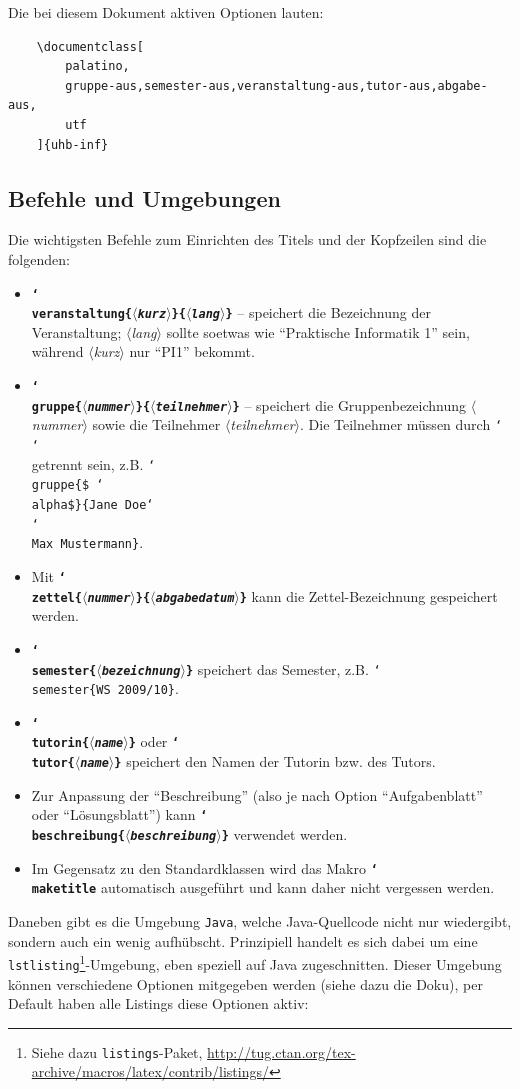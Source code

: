 \documentclass[palatino,gruppe-aus,semester-aus,veranstaltung-aus,abgabe-aus,tutor-aus,utf]{../cls/uhb-inf}
\def\option#1{\texttt{\bfseries #1}}
\def\cs#1{\char`\\#1}
\def\p#1{$\langle$\textit{#1}$\rangle$}
\def\pb#1{\{\p{#1}\}}
\begin{document}
\newpage

Die bei diesem Dokument aktiven Optionen lauten:

\begin{verbatim}
    \documentclass[
        palatino,
        gruppe-aus,semester-aus,veranstaltung-aus,tutor-aus,abgabe-aus,
        utf
    ]{uhb-inf}
\end{verbatim}

\subsection{Befehle und Umgebungen}

Die wichtigsten Befehle zum Einrichten des Titels und der Kopfzeilen sind die folgenden:

\begin{itemize}
	\item \option{\cs{veranstaltung}\pb{kurz}\pb{lang}} -- speichert die Bezeichnung der Veranstaltung; \p{lang} sollte soetwas wie "`Praktische Informatik 1"' sein, während \p{kurz} nur "`PI1"' bekommt.
	\item \option{\cs{gruppe}\pb{nummer}\pb{teilnehmer}} -- speichert die Gruppenbezeichnung \p{nummer} sowie die Teilnehmer \p{teilnehmer}. Die Teilnehmer müssen durch \texttt{\cs\cs{}} getrennt sein, z.B. \texttt{\cs{gruppe}\{\$ \cs{alpha}\$\}\{Jane Doe\cs\cs{}Max Mustermann\}}.
	\item Mit \option{\cs{zettel}\pb{nummer}\pb{abgabedatum}} kann die Zettel-Bezeichnung gespeichert werden.
	\item \option{\cs{semester}\pb{bezeichnung}} speichert das Semester, z.B. \texttt{\cs{semester}\{WS 2009/10\}}.
	\item \option{\cs{tutorin}\pb{name}} oder \option{\cs{tutor}\pb{name}} speichert den Namen der Tutorin bzw. des Tutors.
	\item Zur Anpassung der "`Beschreibung"' (also je nach Option "`Aufgabenblatt"' oder "`Lösungsblatt"') kann \option{\cs{beschreibung}\pb{beschreibung}} verwendet werden.
	\item Im Gegensatz zu den Standardklassen wird das Makro \option{\cs{maketitle}} automatisch ausgeführt und kann daher nicht vergessen werden.
\end{itemize}

Daneben gibt es die Umgebung \texttt{Java}, welche Java-Quellcode nicht nur wiedergibt, sondern auch ein wenig aufhübscht. Prinzipiell handelt es sich dabei um eine \texttt{lstlisting}\footnote{Siehe dazu \texttt{listings}-Paket, \url{http://tug.ctan.org/tex-archive/macros/latex/contrib/listings/}}-Umgebung, eben speziell auf Java zugeschnitten. Dieser Umgebung können verschiedene Optionen mitgegeben werden (siehe dazu die Doku), per Default haben alle Listings diese Optionen aktiv:
\end{document}
